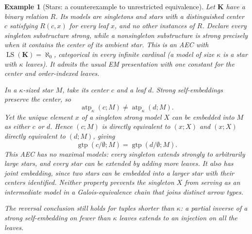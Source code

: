 \documentclass[11pt]{article}
\newcommand{\K}{\mathbf K}
\newcommand{\LS}{\operatorname{LS}}
\newcommand{\atp}{\operatorname{atp}}
\newcommand{\gtp}{\operatorname{gtp}}
\theoremstyle{plain}
\newtheorem{example}[definition]{Example}
\begin{document}
\begin{example}[Stars: a counterexample to unrestricted equivalence]
\label{ex:stars-gtp-arrow}
Let $\K$ have a binary relation $R$.
Its models are singletons and stars with a
distinguished center $c$ satisfying
$R(c,x)$ for every leaf $x$, and no other
instances of $R$. Declare every singleton
substructure strong, while a nonsingleton
substructure is strong precisely when it
contains the center of its ambient star.
This is an AEC with $\LS(\K)=\aleph_0$,
categorical in every infinite cardinal
(a model of size $\kappa$ is a star with
$\kappa$ leaves). It admits the usual
EM presentation with one constant for
the center and order-indexed leaves.

In a $\kappa$-sized star $M$, take its
center $c$ and a leaf $d$. Strong
self-embeddings preserve the center, so
\[
\atp_\kappa(c;M)\ne\atp_\kappa(d;M).
\]
Yet the unique element $x$ of a singleton
strong model $X$ can be embedded into $M$
as either $c$ or $d$. Hence
$(c;M)$ is directly equivalent to $(x;X)$
and $(x;X)$ directly equivalent to $(d;M)$,
giving
\[
\gtp(c/\emptyset;M)=\gtp(d/\emptyset;M).
\]
This AEC has \emph{no maximal models}: every
singleton extends strongly to arbitrarily large stars,
and every star can be extended by adding more leaves.
It also has joint embedding, since two stars can
be embedded into a larger star with their centers
identified. Neither property prevents the
singleton $X$ from serving as an intermediate
model in a Galois-equivalence chain that joins
distinct arrow types.

The reversal conclusion still holds for
tuples shorter than $\kappa$: a partial
inverse of a strong self-embedding on
fewer than $\kappa$ leaves extends to
an injection on all the leaves.
\end{example}
\end{document}
